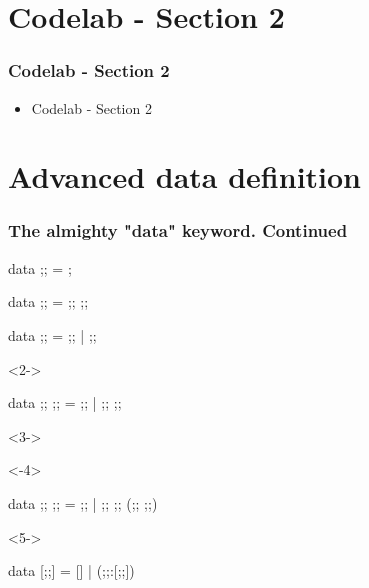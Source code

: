 \documentclass[17pt]{beamer}
\renewcommand{\(}[1]{\begin{columns}[#1]}
\renewcommand{\)}{\end{columns}}
\newcommand{\<}[1]{\begin{column}{#1}}
\renewcommand{\>}{\end{column}}
\begin{document}
\section{Codelab - Section 2}

\begin{frame}
  \frametitle{Codelab - Section 2}
  \begin{itemize}
    \item Codelab - Section 2
  \end{itemize}
\end{frame}


\section{Advanced data definition}

\begin{frame}[fragile]
\frametitle{The almighty "data" keyword.  Continued}
\begin{code}
    data ;;    = ;
\end{code}
\begin{code}
    data ;; = ;; ;;
\end{code}
\begin{code}
    data ;;    =   ;; | ;;
\end{code}
\begin{uncoverenv}<2->
\begin{code}
    data ;; ;; = ;; | ;; ;;
\end{code}
\end{uncoverenv}
\begin{uncoverenv}<3->
\begin{onlyenv}<-4>
\begin{code}
    data ;;  ;; =     ;; | ;; ;; (;; ;;)
\end{code}
\end{onlyenv}
\begin{onlyenv}<5->
\begin{code}
    data [;;]     =      [] | (;;:[;;])
\end{code}
\end{onlyenv}
\end{uncoverenv}
\begin{minipage}[t][.3\textheight]{\textwidth}
\begin{center}

\end{center}
\end{minipage}
\end{frame}
\end{document}
